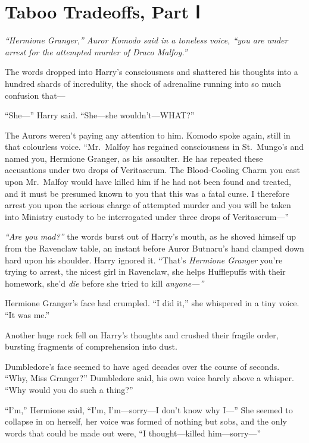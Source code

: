 \chapter{Taboo Tradeoffs, Part Ⅰ}

\emph{``Hermione Granger,'' Auror Komodo said in a toneless voice, ``you
are under arrest for the attempted murder of Draco Malfoy.''}

The words dropped into Harry's consciousness and shattered his thoughts
into a hundred shards of incredulity, the shock of adrenaline running
into so much confusion that---

``She---'' Harry said. ``She---she wouldn't---WHAT?''

The Aurors weren't paying any attention to him. Komodo spoke again,
still in that colourless voice. ``Mr.~Malfoy has regained consciousness
in St.~Mungo's and named you, Hermione Granger, as his assaulter. He has
repeated these accusations under two drops of Veritaserum. The
Blood-Cooling Charm you cast upon Mr.~Malfoy would have killed him if he
had not been found and treated, and it must be presumed known to you
that this was a fatal curse. I therefore arrest you upon the serious
charge of attempted murder and you will be taken into Ministry custody
to be interrogated under three drops of Veritaserum---''

\emph{``Are you mad?''} the words burst out of Harry's mouth, as he
shoved himself up from the Ravenclaw table, an instant before Auror
Butnaru's hand clamped down hard upon his shoulder. Harry ignored it.
``That's \emph{Hermione Granger} you're trying to arrest, the nicest
girl in Ravenclaw, she helps Hufflepuffs with their homework, she'd
\emph{die} before she tried to kill \emph{anyone---''}

Hermione Granger's face had crumpled. ``I did it,'' she whispered in a
tiny voice. ``It was me.''

Another huge rock fell on Harry's thoughts and crushed their fragile
order, bursting fragments of comprehension into dust.

Dumbledore's face seemed to have aged decades over the course of
seconds. ``Why, Miss Granger?'' Dumbledore said, his own voice barely
above a whisper. ``Why would you do such a thing?''

``I'm,'' Hermione said, ``I'm, I'm---sorry---I don't know why I---'' She
seemed to collapse in on herself, her voice was formed of nothing but
sobs, and the only words that could be made out were, ``I
thought---killed him---sorry---''

